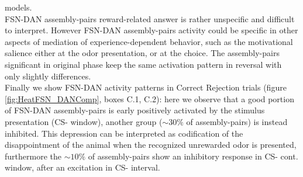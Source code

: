 models.\\FSN-DAN assembly-pairs reward-related answer is rather unspecific and difficult to interpret. However FSN-DAN assembly-pairs activity could be specific in other aspects of mediation of experience-dependent behavior, such as the motivational salience either at the odor presentation, or at the choice. The assembly-pairs significant in original phase keep the same activation pattern in reversal with only slightly differences.\\Finally we show FSN-DAN activity patterns in Correct Rejection trials (figure \ref{fig:HeatFSN_DANComp}, boxes C.1, C.2): here we observe that a good portion of FSN-DAN assembly-pairs is early positively activated by the stimulus presentation (CS- window), another group ($\sim30\%$ of assembly-pairs) is instead inhibited. This depression can be interpreted as codification of the disappointment of the animal when the recognized unrewarded odor is presented, furthermore the $\sim10\%$ of assembly-pairs show an inhibitory response in CS- cont. window, after an excitation in CS- interval.
